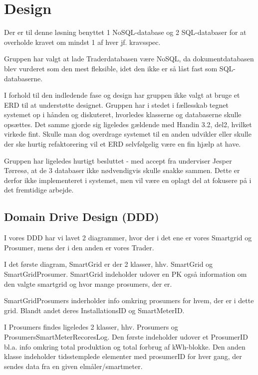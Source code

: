 
\section{Design}

Der er til denne løsning benyttet 1 NoSQL-database og 2 SQL-databaser for at overholde kravet om mindst 1 af hver jf. kravsspec.

Gruppen har valgt at lade Traderdatabasen være NoSQL, da dokumentdatabasen blev vurderet som den mest fleksible, idet den ikke er så låst fast som SQL-databaserne.

I forhold til den indledende fase og design har gruppen ikke valgt at bruge et ERD til at understøtte designet. Gruppen har i stedet i fællesskab tegnet systemet op i hånden og diskuteret, hvorledes klasserne og databaserne skulle opsættes. Det samme gjorde sig ligeledes gældende med Handin 3.2, del2, hvilket virkede fint.
Skulle man dog overdrage systemet til en anden udvikler eller skulle der ske hurtig refaktorering vil et ERD selvfølgelig være en fin hjælp at have.

Gruppen har ligeledes hurtigt besluttet - med accept fra underviser Jesper Tørresø, at de 3 databaser ikke nødvendigvis skulle snakke sammen.
Dette er derfor ikke implementeret i systemet, men vil være en oplagt del at fokusere på i det fremtidige arbejde.

\subsection{Domain Drive Design (DDD)}

I vores DDD har vi lavet 2 diagrammer, hvor der i det ene er vores Smartgrid og Prosumer, mens der i  den anden er vores Trader.

I det første diagram, SmartGrid er der 2 klasser, hhv. SmartGrid og SmartGridProsumer. SmartGrid indeholder udover en PK også information om den valgte smartgrid og hvor mange prosumers, der er.

SmartGridProsumers inderholder info omkring prosumers for hvem, der er i dette grid. Blandt andet deres InstallationsID og SmartMeterID.

I Prosumers findes ligeledes 2 klasser, hhv. Prosumers og ProsumersSmartMeterRecoresLog.
Den første indeholder udover et ProsumerID bl.a. info omkring total produktion og total forbrug af kWh-blokke. Den anden klasse indeholder tidsstemplede elementer med prosumerID for hver gang, der sendes data fra en given elmåler/smartmeter.


